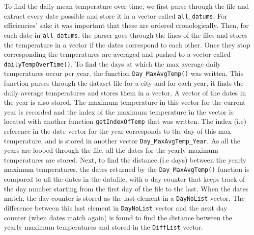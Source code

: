 To find the daily mean temperature over time, we first parse through the file and extract every date possible and store it in a vector called \texttt{all\_datums}. For efficiencies' sake it was important that these are ordered cronologically. Then, for each date in \texttt{all\_datums}, the parser goes through the lines of the files and stores the temperature in a vector if the dates correspond to each other. Once they stop corresponding the temperatures are averaged and pushed to a vector called \texttt{dailyTempOverTime()}.
\newline
\newline
To find the days at which the max average daily temperatures occur per year, the function \texttt{Day\_MaxAvgTemp()} was written. This function parses through the dataset file for a city and for each year, it finds the daily average temperatures and stores them in a vector. A vector of the dates in the year is also stored. The maximum temperature in this vector for the current year is recorded and the index of the maximum temperature in the vector is located with another function \texttt{getIndexOfTemp} that was written. The index (i.e) reference in the date vector for the year corresponds to the day of this max temperature, and is stored in another vector \texttt{Day\_MaxAvgTemp\_Year}. As all the years are looped through the file, all the dates for the yearly maximum temperatures are stored.
\newline
\newline
Next, to find the distance (i.e days) between the yearly maximum temperatures, the dates returned by the \texttt{Day\_MaxAvgTemp()} function is compared to all the dates in the datafile, with a day counter that keeps track of the day number starting from the first day of the file  to the last. When the dates match, the day counter is stored as the last element in a \texttt{DayNoList} vector. The difference between this last element in \texttt{DayNoList} vector and the next day counter (when dates match again) is found to find the distance between the yearly maximum temperatures and stored in the \texttt{DiffList} vector. 
